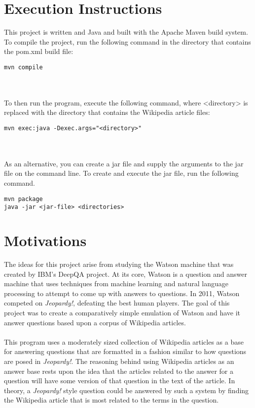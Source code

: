 \documentclass{article}%
\begin{document}
\section*{Execution Instructions}

This project is written and Java and built with the Apache Maven build system. To compile the project, run the following
command in the directory that contains the pom.xml build file:

\begin{lstlisting}[frame=single]
mvn compile
\end{lstlisting}\\
\\
To then run the program, execute the following command, where <directory> is replaced with the directory that contains
the Wikipedia article files:

\begin{lstlisting}[frame=single]
mvn exec:java -Dexec.args="<directory>"
\end{lstlisting}\\
\\
As an alternative, you can create a jar file and supply the arguments to the jar file on the command line. To create and
execute the jar file, run the following command.

\begin{lstlisting}[frame=single]
mvn package
java -jar <jar-file> <directories>
\end{lstlisting}
\section*{Motivations}
The ideas for this project arise from studying the Watson machine that was created by IBM's DeepQA project. At its core,
Watson is a question and answer machine that uses techniques from machine learning and natural language processing to
attempt to come up with answers to questions. In 2011, Watson competed on \textit{Jeopardy!}, defeating the
best human players. The goal of this project was to create a comparatively simple emulation of Watson and have it answer
questions based upon a corpus of Wikipedia articles.\\
\\
This program uses a moderately sized collection of Wikipedia articles as a base for answering questions that are formatted
in a fashion similar to how questions are posed in \textit{Jeopardy!}. The reasoning behind using Wikipedia articles as an
answer base rests upon the idea that the articles related to the answer for a question will have some version of that
question in the text of the article. In theory, a \textit{Jeopardy!} style question could be answered by such a system by
finding the Wikipedia article that is most related to the terms in the question.
\end{document}

